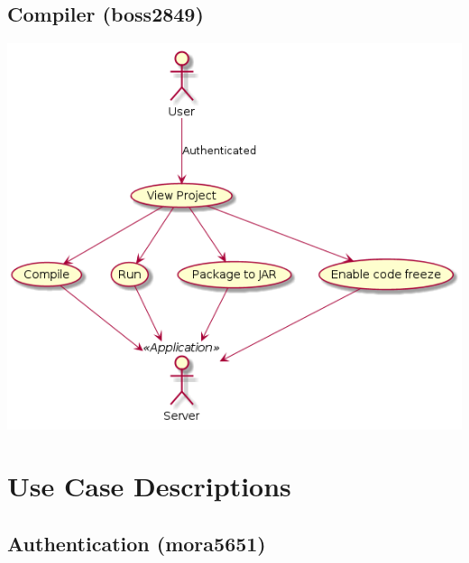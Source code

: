 \documentclass[11pt]{report}
\begin{document}
    \section{Compiler (boss2849)}
        \includegraphics[width=\textwidth]{diagrams/usecase-compiler}
    
    
    
    



\chapter{Use Case Descriptions}

\section{Authentication (mora5651)}
\end{document}
